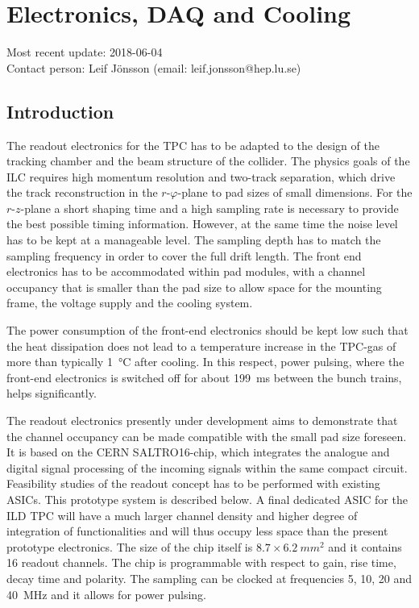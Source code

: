 \section{Electronics, DAQ and Cooling}\label{chap:TPC_sec:electronics}
Most recent update: 2018-06-04 \\
Contact person: Leif J{\"o}nsson (email: leif.jonsson@hep.lu.se)

\subsection{Introduction}
The readout electronics for the TPC has to be adapted to the design of the tracking chamber and the beam structure of the collider. The physics goals of the ILC requires high momentum resolution and two-track separation, which drive the track reconstruction in the $r\text{-}\varphi$-plane to pad sizes of small dimensions. For the $r\text{-}z$-plane a short shaping time and a high sampling rate is necessary to provide the best possible timing information. However, at the same time the noise level has to be kept at a manageable level. The sampling depth has to match the sampling frequency in order to cover the full drift length. The front end electronics has to be accommodated within pad modules, with a channel occupancy that is smaller than the pad size to allow space for the mounting frame, the voltage supply and the cooling system.

The power consumption of the front-end electronics should be kept low such that the heat dissipation does not lead to a temperature increase in the TPC-gas of more than typically \SI{1}{\degreeCelsius} after cooling. In this respect, power pulsing, where the front-end electronics is switched off for about \SI{199}{ms} between the bunch trains, helps significantly.

The readout electronics presently under development aims to demonstrate that the channel occupancy can be made compatible with the small pad size foreseen. It is based on the CERN SALTRO16-chip, which integrates the analogue and digital signal processing of the incoming signals within the same compact circuit. Feasibility studies of the readout concept has to be performed with existing ASICs. This prototype system is described below. A final dedicated ASIC for the ILD TPC will have a much larger channel density and higher degree of integration of functionalities and will thus occupy less space than the present prototype electronics. The size of the chip itself is $8.7 \times \SI{6.2}{mm^2}$ and it contains 16 readout channels. The chip is programmable with respect to gain, rise time, decay time and polarity. The sampling can be clocked at frequencies 5, 10, 20 and \SI{40}{MHz} and it allows for power pulsing.

